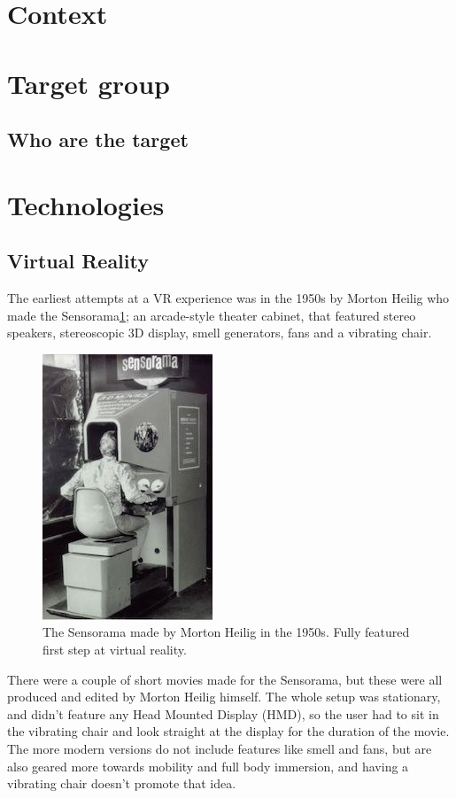 	\section{Context}
		
	\section{Target group}\label{sec:targetGroup}
		\subsection{Who are the target }
		
	\section{Technologies}\label{sec:technologies}

		\subsection{Virtual Reality}
			The earliest attempts at a VR experience was in the 1950s\cite{VRS} by Morton Heilig who made the Sensorama\ref{fig:sensorama}; an arcade-style theater cabinet, that featured stereo speakers, stereoscopic 3D display, smell generators, fans and a vibrating chair.
			\begin{figure}[H]
				\centering
				\includegraphics[width=0.4\linewidth]{figure/Analysis/sensorama2}
				\caption{The Sensorama made by Morton Heilig in the 1950s. Fully featured first step at virtual reality.}
				\label{fig:sensorama}
			\end{figure}
			There were a couple of short movies made for the Sensorama, but these were all produced and edited by Morton Heilig himself. The whole setup was stationary, and didn't feature any Head Mounted Display (HMD), so the user had to sit in the vibrating chair and look straight at the display for the duration of the movie. The more modern versions do not include features like smell and fans, but are also geared more towards mobility and full body immersion, and having a vibrating chair doesn't promote that idea.\\
			
